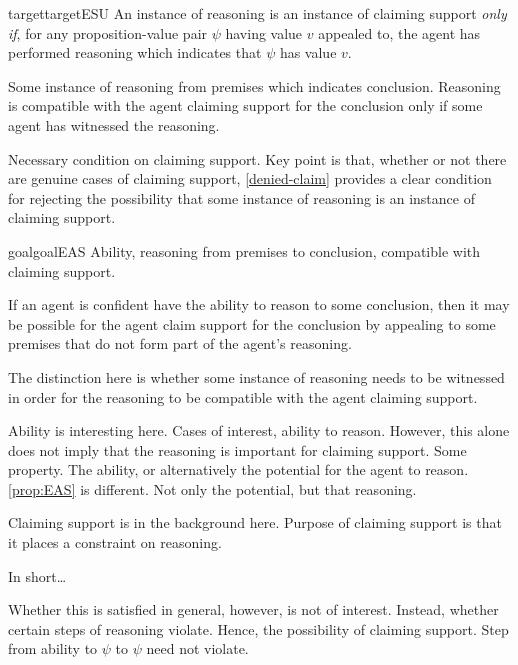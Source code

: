 \begin{note}
  \begin{restatable}{target}{targetESU}
    \label{denied-claim}
    An instance of reasoning is an instance of claiming support \emph{only if}, for any proposition-value pair \(\psi\) having value \(v\) appealed to, the agent has performed reasoning which indicates that \(\psi\) has value \(v\).
  \end{restatable}


  Some instance of reasoning from premises which indicates conclusion.
  Reasoning is compatible with the agent claiming support for the conclusion only if some agent has witnessed the reasoning.

  Necessary condition on claiming support.
  Key point is that, whether or not there are genuine cases of claiming support, \autoref{denied-claim} provides a clear condition for rejecting the possibility that some instance of reasoning is an instance of claiming support.
\end{note}

\begin{note}
  \begin{restatable}{goal}{goalEAS}
    \label{prop:EAS}
    {
      \color{red}
      Ability, reasoning from premises to conclusion, compatible with claiming support.
    }

    If an agent is confident have the ability to reason to some conclusion, then it may be possible for the agent claim support for the conclusion by appealing to some premises that do not form part of the agent's reasoning.
  \end{restatable}
\end{note}

\begin{note}
  The distinction here is whether some instance of reasoning needs to be witnessed in order for the reasoning to be compatible with the agent claiming support.

  Ability is interesting here.
  Cases of interest, ability to reason.
  However, this alone does not imply that the reasoning is important for claiming support.
  Some property.
  The ability, or alternatively the potential for the agent to reason.
  \autoref{prop:EAS} is different.
  Not only the potential, but that reasoning.
\end{note}

\begin{note}
  Claiming support is in the background here.
  Purpose of claiming support is that it places a constraint on reasoning.

  In short\dots

  Whether this is satisfied in general, however, is not of interest.
  Instead, whether certain steps of reasoning violate.
  Hence, the possibility of claiming support.
  Step from ability to \(\psi\) to \(\psi\) need not violate.
\end{note}

